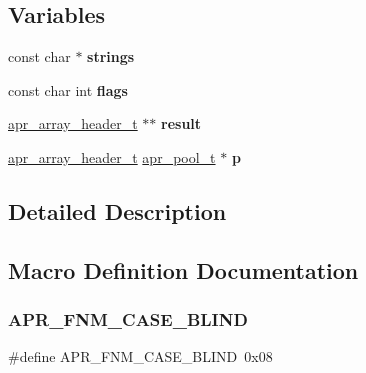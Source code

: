 \subsection*{Variables}
\begin{DoxyCompactItemize}
\item 
\mbox{\label{group__apr__fnmatch_ga1b8521735ca7e48893ad6958cba59a7b}} 
const char $\ast$ {\bfseries strings}
\item 
\mbox{\label{group__apr__fnmatch_ga3e6d697dc0ff44866a7ba96989912775}} 
const char int {\bfseries flags}
\item 
\mbox{\label{group__apr__fnmatch_ga5870bc70d0e7e1e79ec7b4c512a92c4b}} 
\mbox{\hyperlink{structapr__array__header__t}{apr\+\_\+array\+\_\+header\+\_\+t}} $\ast$$\ast$ {\bfseries result}
\item 
\mbox{\label{group__apr__fnmatch_ga4aaa19306a024e92edb34e88100061f6}} 
\mbox{\hyperlink{structapr__array__header__t}{apr\+\_\+array\+\_\+header\+\_\+t}} \mbox{\hyperlink{group__apr__pools_gaf137f28edcf9a086cd6bc36c20d7cdfb}{apr\+\_\+pool\+\_\+t}} $\ast$ {\bfseries p}
\end{DoxyCompactItemize}


\subsection{Detailed Description}


\subsection{Macro Definition Documentation}
\mbox{\label{group__apr__fnmatch_ga5cee1c0a917a283a193721d11160b502}} 
\subsubsection{\texorpdfstring{A\+P\+R\+\_\+\+F\+N\+M\+\_\+\+C\+A\+S\+E\+\_\+\+B\+L\+I\+ND}{APR\_FNM\_CASE\_BLIND}}
{\footnotesize\ttfamily \#define A\+P\+R\+\_\+\+F\+N\+M\+\_\+\+C\+A\+S\+E\+\_\+\+B\+L\+I\+ND~0x08}

